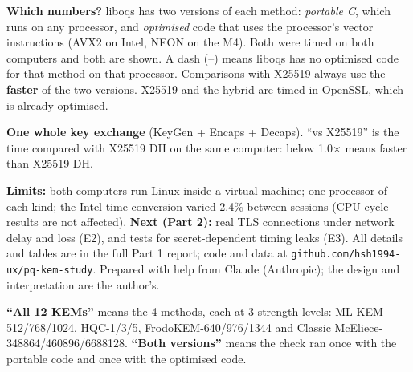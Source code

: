\documentclass[10pt,a4paper]{article}
\newcommand{\head}[1]{\par\Needspace{8\baselineskip}\vspace{10pt}{\sffamily\bfseries\large #1}\par\vspace{0pt}}
\begin{document}
\head{5\quad E1: results}
\textbf{Which numbers?} liboqs has two versions of each method: \emph{portable C}, which runs on any processor, and \emph{optimised} code that uses the processor's vector instructions (AVX2 on Intel, NEON on the M4). Both were timed on both computers and both are shown. A dash (–) means liboqs has no optimised code for that method on that processor. Comparisons with X25519 always use the \textbf{faster} of the two versions. X25519 and the hybrid are timed in OpenSSL, which is already optimised.

\textbf{One whole key exchange} (KeyGen + Encaps + Decaps). ``vs X25519'' is the time compared with X25519 DH on the same computer: below 1.0× means faster than X25519 DH.
\begin{table}[H]
\centering\footnotesize\setlength{\tabcolsep}{3.9pt}

\caption{Bytes sent, memory and time for one key exchange. Level = NIST strength level (1, 3, 5 $\approx$ AES-128, -192, -256). Memory = peak working memory (stack, KiB) of the most demanding step. Portable = portable C. (\emph{n}×) after an optimised time = how many times faster it is than portable C. – = no optimised code. ``vs X25519'' uses the faster version.}
\label{tab:full}
\end{table}

\begin{table}[H]
\centering\footnotesize


\caption{Each step separately: median time per call, for both code versions. – = no optimised code. For McEliece, KeyGen is the slow step, and the optimised Intel code makes Decaps 510--1,400× faster; for ML-KEM and HQC, Decaps is slowest. McEliece KeyGen times vary a lot from run to run (random retries, see section 3).}
\end{table}

{\small\color{ink2}\textbf{Limits:} both computers run Linux inside a virtual machine; one processor of each kind; the Intel time conversion varied 2.4\% between sessions (CPU-cycle results are not affected). \textbf{Next (Part 2):} real TLS connections under network delay and loss (E2), and tests for secret-dependent timing leaks (E3). All details and tables are in the full Part 1 report; code and data at \texttt{github.com/hsh1994-ux/pq-kem-study}. Prepared with help from Claude (Anthropic); the design and interpretation are the author's.\par}

\clearpage
\head{Appendix A\quad The five correctness checks (Table 1)}
\textbf{``All 12 KEMs''} means the 4 methods, each at 3 strength levels: ML-KEM-512/768/1024, HQC-1/3/5, FrodoKEM-640/976/1344 and Classic McEliece-348864/460896/6688128. \textbf{``Both versions''} means the check ran once with the portable code and once with the optimised code.
\end{document}
